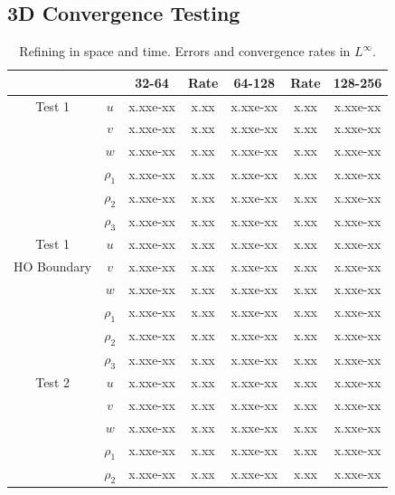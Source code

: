 \documentclass[final]{siamltex}
\begin{document}
\subsection{3D Convergence Testing}

\begin{table}[h]
\begin{center}
\caption{Refining in space and time.  Errors and convergence rates in $L^\infty$.}
\label{tab:Linf_3d}
\begin{tabular}{ccccccc}
& & 32-64 & Rate & 64-128 & Rate & 128-256 \\
\hline
Test 1              & $u$      & x.xxe-xx & x.xx & x.xxe-xx & x.xx & x.xxe-xx \\
                    & $v$      & x.xxe-xx & x.xx & x.xxe-xx & x.xx & x.xxe-xx \\
                    & $w$      & x.xxe-xx & x.xx & x.xxe-xx & x.xx & x.xxe-xx \\
                    & $\rho_1$ & x.xxe-xx & x.xx & x.xxe-xx & x.xx & x.xxe-xx \\
                    & $\rho_2$ & x.xxe-xx & x.xx & x.xxe-xx & x.xx & x.xxe-xx \\
                    & $\rho_3$ & x.xxe-xx & x.xx & x.xxe-xx & x.xx & x.xxe-xx \\
\hline
Test 1              & $u$      & x.xxe-xx & x.xx & x.xxe-xx & x.xx & x.xxe-xx \\
HO Boundary         & $v$      & x.xxe-xx & x.xx & x.xxe-xx & x.xx & x.xxe-xx \\
                    & $w$      & x.xxe-xx & x.xx & x.xxe-xx & x.xx & x.xxe-xx \\
                    & $\rho_1$ & x.xxe-xx & x.xx & x.xxe-xx & x.xx & x.xxe-xx \\
                    & $\rho_2$ & x.xxe-xx & x.xx & x.xxe-xx & x.xx & x.xxe-xx \\
                    & $\rho_3$ & x.xxe-xx & x.xx & x.xxe-xx & x.xx & x.xxe-xx \\
\hline
Test 2              & $u$      & x.xxe-xx & x.xx & x.xxe-xx & x.xx & x.xxe-xx \\
                    & $v$      & x.xxe-xx & x.xx & x.xxe-xx & x.xx & x.xxe-xx \\
                    & $w$      & x.xxe-xx & x.xx & x.xxe-xx & x.xx & x.xxe-xx \\
                    & $\rho_1$ & x.xxe-xx & x.xx & x.xxe-xx & x.xx & x.xxe-xx \\
                    & $\rho_2$ & x.xxe-xx & x.xx & x.xxe-xx & x.xx & x.xxe-xx \\

\end{tabular}
\end{center}
\end{table}
\end{document}
